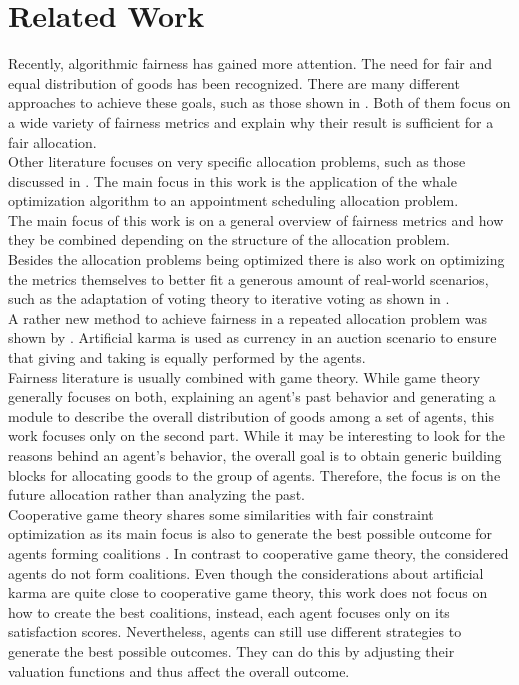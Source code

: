 \documentclass[german, a4paper, 11pt, oneside]{scrbook}
\begin{document}
\chapter{Related Work}
Recently, algorithmic fairness has gained more attention. The need for fair and equal distribution of goods has been recognized. There are many different approaches to achieve these goals, such as those shown in \cite{.2022,FelixBrandtVincentConitzerUlleEndrissJeromeLangandArielD.Procaccia.}. Both of them focus on a wide variety of fairness metrics and explain why their result is sufficient for a fair allocation. \\Other literature focuses on very specific allocation problems, such as those discussed in \cite{Ala.2021}. The main focus in this work is the application of the whale optimization algorithm to an appointment scheduling allocation problem. \\The main focus of this work is on a general overview of fairness metrics and how they be combined depending on the structure of the allocation problem.\\  Besides the allocation problems being optimized there is also work on optimizing the metrics themselves to better fit a generous amount of real-world scenarios, such as the adaptation of voting theory to iterative voting as shown in \cite{Bhavnani.2022b}. 
\\ A rather new method to achieve fairness in a repeated allocation problem was shown by \cite{Elokda.2023}. Artificial karma is used as currency in an auction scenario to ensure that giving and taking is equally performed by the agents.
 \\Fairness literature is usually combined with game theory.
While game theory generally focuses on both, explaining an agent's past behavior and generating a module to describe the overall distribution of goods among a set of agents, this work focuses only on the second part. While it may be interesting to look for the reasons behind an agent's behavior, the overall goal is to obtain generic building blocks for allocating goods to the group of agents. Therefore, the focus is on the future allocation rather than analyzing the past.
\\Cooperative game theory shares some similarities with fair constraint optimization as its main focus is also to generate the best possible outcome for agents forming coalitions \cite{.2022}. In contrast to cooperative game theory, the considered agents do not form coalitions. Even though the considerations about artificial karma are quite close to cooperative game theory, this work does not focus on how to create the best coalitions, instead, each agent focuses only on its satisfaction scores. Nevertheless, agents can still use different strategies to generate the best possible outcomes. They can do this by adjusting their valuation functions and thus affect the overall outcome.
\end{document}
